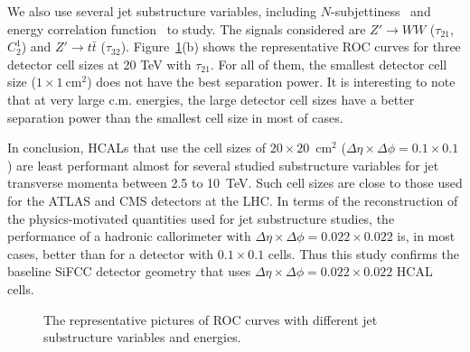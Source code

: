 \documentclass[a4paper]{PoS}
\begin{document}
We also use several jet substructure variables, including $N$-subjettiness~\cite{Thaler:2010tr} and energy correlation function~\cite{Larkoski:2013eya} to study. The signals considered are $Z'\rightarrow WW$ ($\tau_{21}$,$C_2^1$) and $Z' \rightarrow t\bar{t}$ ($\tau_{32}$). Figure~\ref{1}(b) shows the representative ROC curves for three detector cell sizes at 20 TeV with $\tau_{21}$. For all of them, the smallest detector cell size ($1\times1~\mathrm{cm}^2$) does not have the best separation power. It is interesting to note that at very large c.m. energies, the large detector cell sizes have a better separation power than the smallest cell size in most of cases. 

In conclusion, HCALs that use the cell sizes of $20\times 20$~cm$^2$ ($\Delta \eta \times \Delta \phi = 0.1\times0.1$) 
are least performant almost for several studied 
substructure variables for jet transverse momenta between 2.5 to 10~TeV. 
Such cell sizes are close to 
those used for the ATLAS and CMS detectors at the LHC. 
In terms of the reconstruction of the physics-motivated quantities  
used for jet substructure studies, the  performance 
of a  hadronic callorimeter  with 
$\Delta \eta \times \Delta \phi = 0.022\times0.022$ is, in most cases,
better than for a detector with  $0.1\times0.1$ cells.
Thus this study confirms the  baseline SiFCC detector geometry \cite{Chekanov:2016ppq}
that uses $\Delta \eta \times \Delta \phi = 0.022\times0.022$ HCAL cells.


\begin{figure}
\begin{center}
\end{center}
\caption{The representative pictures of ROC curves with different jet substructure variables and energies.}
\label{1}
\end{figure}
\end{document}

